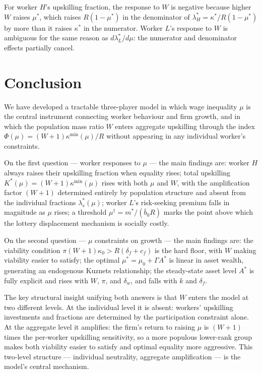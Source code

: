 \documentclass[12pt,a4paper]{article}
\begin{document}
For worker $H$'s upskilling fraction, the response to $W$ is negative
because higher $W$ raises $\mu^*$, which raises $R(1-\mu^*)$ in the
denominator of $\lambda_H^* = \kappa^*/R(1-\mu^*)$ by more than it
raises $\kappa^*$ in the numerator. Worker $L$'s response to $W$ is
ambiguous for the same reason as $d\lambda_L^*/d\mu$: the numerator
and denominator effects partially cancel.

\section{Conclusion}

We have developed a tractable three-player model in which wage inequality
$\mu$ is the central instrument connecting worker behaviour and firm
growth, and in which the population mass ratio $W$ enters aggregate
upskilling through the index $\Phi(\mu) = (W+1)\kappa^{\min}(\mu)/R$
without appearing in any individual worker's constraints.

On the first question --- worker responses to $\mu$ --- the main findings
are: worker $H$ always raises their upskilling fraction when equality
rises; total upskilling $K^*(\mu) = (W+1)\kappa^{\min}(\mu)$ rises with
both $\mu$ and $W$, with the amplification factor $(W+1)$ determined
entirely by population structure and absent from the individual fractions
$\lambda_s^*(\mu)$; worker $L$'s risk-seeking premium falls in magnitude
as $\mu$ rises; a threshold $\mu^\dagger = m^*/(\bar{b}_0 R)$ marks the
point above which the lottery displacement mechanism is socially costly.

On the second question --- $\mu$ constraints on growth --- the main
findings are: the viability condition $\pi(W+1)\kappa_0 > R(\delta_f+c_f)$
is the hard floor, with $W$ making viability easier to satisfy; the
optimal $\mu^* = \mu_0+\Gamma A^*$ is linear in asset wealth, generating
an endogenous Kuznets relationship; the steady-state asset level $A^*$
is fully explicit and rises with $W$, $\pi$, and $\delta_w$, and falls
with $k$ and $\delta_f$.

The key structural insight unifying both answers is that $W$ enters
the model at two different levels. At the individual level it is absent:
workers' upskilling investments and fractions are determined by the
participation constraint alone. At the aggregate level it amplifies:
the firm's return to raising $\mu$ is $(W+1)$ times the per-worker
upskilling sensitivity, so a more populous lower-rank group makes both
viability easier to satisfy and optimal equality more aggressive. This
two-level structure --- individual neutrality, aggregate amplification
--- is the model's central mechanism.
\end{document}
